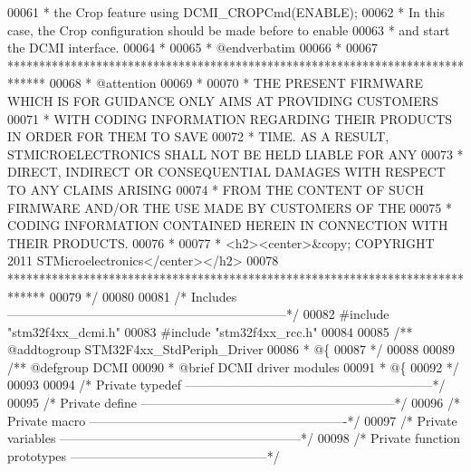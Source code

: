 \begin{DoxyCode}
00061 \textcolor{comment}{  *         the Crop feature using DCMI\_CROPCmd(ENABLE);  }
00062 \textcolor{comment}{  *         In this case, the Crop configuration should be made before to enable}
00063 \textcolor{comment}{  *         and start the DCMI interface. }
00064 \textcolor{comment}{  *        }
00065 \textcolor{comment}{  *  @endverbatim   }
00066 \textcolor{comment}{  *  }
00067 \textcolor{comment}{  ******************************************************************************}
00068 \textcolor{comment}{  * @attention}
00069 \textcolor{comment}{  *}
00070 \textcolor{comment}{  * THE PRESENT FIRMWARE WHICH IS FOR GUIDANCE ONLY AIMS AT PROVIDING CUSTOMERS}
00071 \textcolor{comment}{  * WITH CODING INFORMATION REGARDING THEIR PRODUCTS IN ORDER FOR THEM TO SAVE}
00072 \textcolor{comment}{  * TIME. AS A RESULT, STMICROELECTRONICS SHALL NOT BE HELD LIABLE FOR ANY}
00073 \textcolor{comment}{  * DIRECT, INDIRECT OR CONSEQUENTIAL DAMAGES WITH RESPECT TO ANY CLAIMS ARISING}
00074 \textcolor{comment}{  * FROM THE CONTENT OF SUCH FIRMWARE AND/OR THE USE MADE BY CUSTOMERS OF THE}
00075 \textcolor{comment}{  * CODING INFORMATION CONTAINED HEREIN IN CONNECTION WITH THEIR PRODUCTS.}
00076 \textcolor{comment}{  *}
00077 \textcolor{comment}{  * <h2><center>&copy; COPYRIGHT 2011 STMicroelectronics</center></h2>}
00078 \textcolor{comment}{  ******************************************************************************}
00079 \textcolor{comment}{  */}
00080 
00081 \textcolor{comment}{/* Includes ------------------------------------------------------------------*/}
00082 \textcolor{preprocessor}{#}\textcolor{preprocessor}{include} "stm32f4xx_dcmi.h"
00083 \textcolor{preprocessor}{#}\textcolor{preprocessor}{include} "stm32f4xx_rcc.h"
00084 
00085 \textcolor{comment}{/** @addtogroup STM32F4xx\_StdPeriph\_Driver}
00086 \textcolor{comment}{  * @\{}
00087 \textcolor{comment}{  */}
00088 
00089 \textcolor{comment}{/** @defgroup DCMI }
00090 \textcolor{comment}{  * @brief DCMI driver modules}
00091 \textcolor{comment}{  * @\{}
00092 \textcolor{comment}{  */}
00093 
00094 \textcolor{comment}{/* Private typedef -----------------------------------------------------------*/}
00095 \textcolor{comment}{/* Private define ------------------------------------------------------------*/}
00096 \textcolor{comment}{/* Private macro -------------------------------------------------------------*/}
00097 \textcolor{comment}{/* Private variables ---------------------------------------------------------*/}
00098 \textcolor{comment}{/* Private function prototypes -----------------------------------------------*/}

\end{DoxyCode}
